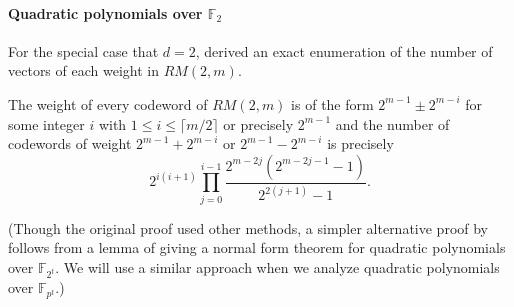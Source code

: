
\paragraph{Quadratic polynomials over $\mathbb{F}_2$}
For the special case that $d=2$, \cite{DBLP:journals/tit/SloaneB70} derived an exact
enumeration of the number of vectors of each weight in $RM(2,m)$.

\begin{proposition}\cite{DBLP:journals/tit/SloaneB70}
\label{lem:RM(2,m)-count}
The weight of every codeword of $RM(2,m)$ is of the form $2^{m-1}\pm 2^{m-i}$
for some integer $i$ with $1\le i\le \lceil m/2\rceil$ or precisely $2^{m-1}$
and the number of codewords of weight $2^{m-1}+2^{m-i}$ or $2^{m-1}-2^{m-i}$ 
is precisely
$$2^{i(i+1)} \prod_{j=0}^{i-1} \frac{2^{m-2j}(2^{m-2j-1}-1)}{2^{2(j+1)}-1}.$$
\end{proposition}

(Though the original proof used other methods, a simpler alternative
proof by \cite{mceliece1967linear} follows from
a lemma of  \cite{dickson:book} giving a normal form theorem for quadratic polynomials over
$\mathbb{F}_{2^t}$.  
We will use a similar approach when we analyze
quadratic polynomials over $\mathbb{F}_{p^t}$.)


